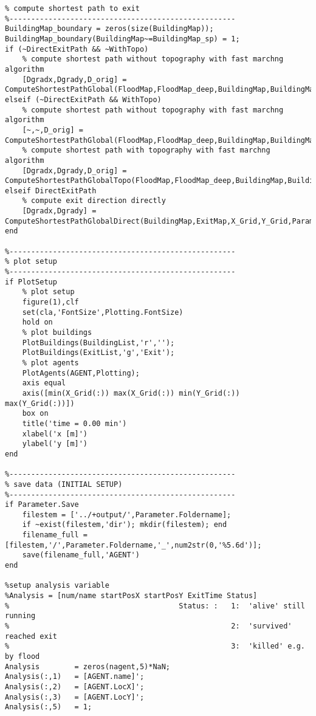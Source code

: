 \begin{lstlisting}[breaklines]
%----------------------------------------------------
% compute shortest path to exit
%----------------------------------------------------
BuildingMap_boundary = zeros(size(BuildingMap)); BuildingMap_boundary(BuildingMap~=BuildingMap_sp) = 1;
if (~DirectExitPath && ~WithTopo)
    % compute shortest path without topography with fast marchng algorithm
    [Dgradx,Dgrady,D_orig] = ComputeShortestPathGlobal(FloodMap,FloodMap_deep,BuildingMap,BuildingMap_boundary,ExitMap,X_Grid,Y_Grid,Parameter);
elseif (~DirectExitPath && WithTopo)
    % compute shortest path without topography with fast marchng algorithm
    [~,~,D_orig] = ComputeShortestPathGlobal(FloodMap,FloodMap_deep,BuildingMap,BuildingMap_boundary,ExitMap,X_Grid,Y_Grid,Parameter);
    % compute shortest path with topography with fast marchng algorithm
    [Dgradx,Dgrady,D_orig] = ComputeShortestPathGlobalTopo(FloodMap,FloodMap_deep,BuildingMap,BuildingMap_boundary,ExitMap,X_Grid,Y_Grid,Z_Grid,D_orig,Gradient_x,Gradient_y,Parameter);
elseif DirectExitPath
    % compute exit direction directly
    [Dgradx,Dgrady] = ComputeShortestPathGlobalDirect(BuildingMap,ExitMap,X_Grid,Y_Grid,Parameter.v0,Parameter.resolution);
end

%----------------------------------------------------
% plot setup
%----------------------------------------------------
if PlotSetup
    % plot setup
    figure(1),clf
    set(cla,'FontSize',Plotting.FontSize)
    hold on
    % plot buildings
    PlotBuildings(BuildingList,'r','');
    PlotBuildings(ExitList,'g','Exit');
    % plot agents
    PlotAgents(AGENT,Plotting);
    axis equal
    axis([min(X_Grid(:)) max(X_Grid(:)) min(Y_Grid(:)) max(Y_Grid(:))])
    box on
    title('time = 0.00 min')
    xlabel('x [m]')
    ylabel('y [m]')
end

%----------------------------------------------------
% save data (INITIAL SETUP)
%----------------------------------------------------
if Parameter.Save
    filestem = ['../+output/',Parameter.Foldername];
    if ~exist(filestem,'dir'); mkdir(filestem); end
    filename_full = [filestem,'/',Parameter.Foldername,'_',num2str(0,'%5.6d')];
    save(filename_full,'AGENT')
end

%setup analysis variable
%Analysis = [num/name startPosX startPosY ExitTime Status]
%                                       Status:	:   1:  'alive' still running
%                                                   2:  'survived' reached exit
%                                                   3:  'killed' e.g. by flood
Analysis        = zeros(nagent,5)*NaN;
Analysis(:,1)   = [AGENT.name]';
Analysis(:,2)   = [AGENT.LocX]';
Analysis(:,3)   = [AGENT.LocY]';
Analysis(:,5)   = 1;




\end{lstlisting}
